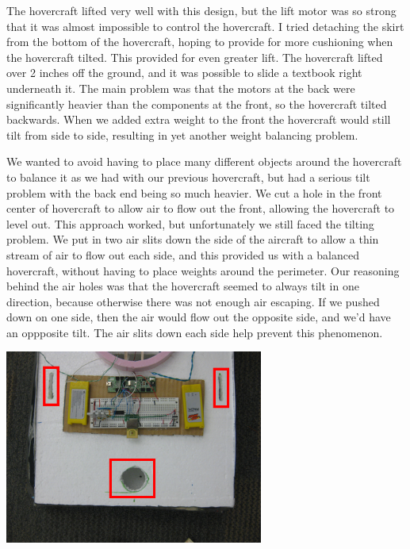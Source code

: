 The hovercraft lifted very well with this design, but the lift motor was so strong that it was almost impossible to control
the hovercraft. I tried detaching the skirt from the bottom of the hovercraft, hoping to provide for more cushioning when
the hovercraft tilted. This provided for even greater lift. The hovercraft lifted over 2 inches off the ground, and it was
possible to slide a textbook right underneath it. The main
problem was that the motors at the back were significantly heavier than the components at the front, so the hovercraft
tilted backwards. When we added extra weight to the front the hovercraft would still tilt from side to side, resulting
in yet another weight balancing problem.

We wanted to avoid having to place many different objects around the hovercraft to balance it as we had with our previous
hovercraft, but had a serious tilt problem with the back end being so much heavier. We cut a hole in the front center of 
hovercraft to allow air to flow out the front, allowing the hovercraft to level out. This approach worked, but unfortunately
we still faced the tilting problem. We put in two air slits down the side of the aircraft to allow a thin stream of air
to flow out each side, and this provided us with a balanced hovercraft, without having to place weights around the perimeter.
Our reasoning behind the air holes was that the hovercraft seemed to always tilt in one direction, because otherwise there
was not enough air escaping. If we pushed down on one side, then the air would flow out the opposite side, and we'd have 
an oppposite tilt. The air slits down each side help prevent this phenomenon.

\begin{center}
  \includegraphics[width=85mm]{imageSources/designProblemsnew_holeshighlighted.png}
\end{center}
\label{new_holes}

